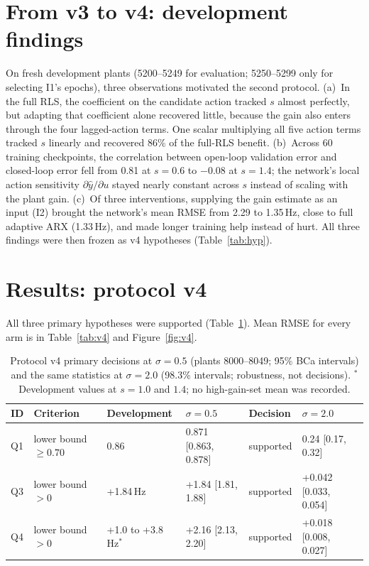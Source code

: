 \documentclass[11pt]{article}
\newcommand{\Hz}{\,Hz}
\begin{document}
\section{From v3 to v4: development findings}
On fresh development plants (5200--5249 for evaluation; 5250--5299 only for selecting I1's epochs), three observations motivated the second protocol. (a)~In the full RLS, the coefficient on the candidate action tracked $s$ almost perfectly, but adapting that coefficient alone recovered little, because the gain also enters through the four lagged-action terms. One scalar multiplying all five action terms tracked $s$ linearly and recovered 86\% of the full-RLS benefit. (b)~Across 60 training checkpoints, the correlation between open-loop validation error and closed-loop error fell from 0.81 at $s=0.6$ to $-0.08$ at $s=1.4$; the network's local action sensitivity $\partial\hat y/\partial u$ stayed nearly constant across $s$ instead of scaling with the plant gain. (c)~Of three interventions, supplying the gain estimate as an input (I2) brought the network's mean RMSE from 2.29 to 1.35\Hz, close to full adaptive ARX (1.33\Hz), and made longer training help instead of hurt. All three findings were then frozen as v4 hypotheses (Table~\ref{tab:hyp}).

\section{Results: protocol v4}
All three primary hypotheses were supported (Table~\ref{tab:primary}). Mean RMSE for every arm is in Table~\ref{tab:v4} and Figure~\ref{fig:v4}.

\begin{table}[t]\centering\small
\caption{Protocol v4 primary decisions at $\sigma=0.5$ (plants 8000--8049; 95\% BCa intervals) and the same statistics at $\sigma=2.0$ (98.3\% intervals; robustness, not decisions). $^*$Development values at $s=1.0$ and $1.4$; no high-gain-set mean was recorded.}\label{tab:primary}
\begin{tabular}{@{}llllll@{}}\toprule
ID & Criterion & Development & $\sigma=0.5$ & Decision & $\sigma=2.0$\\\midrule
Q1 & lower bound $\ge0.70$ & 0.86 & 0.871 [0.863, 0.878] & supported & 0.24 [0.17, 0.32]\\
Q3 & lower bound $>0$ & +1.84\Hz & +1.84 [1.81, 1.88] & supported & +0.042 [0.033, 0.054]\\
Q4 & lower bound $>0$ & +1.0 to +3.8\Hz$^*$ & +2.16 [2.13, 2.20] & supported & +0.018 [0.008, 0.027]\\\bottomrule
\end{tabular}\end{table}
\end{document}
